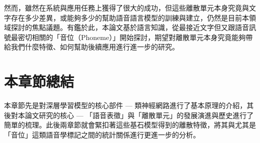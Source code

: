 然而，雖然在系統與應用任務上獲得了很大的成功，但這些離散單元本身究竟與文字存在多少差異，或能夠多少的幫助語音語言模型的訓練與建立，仍然是目前本領域探討的焦點議題。有鑑於此，本論文基於語言知識，從最接近文字但又跟語音訊號最密切相關的「音位（Phoneme）」開始探討，期望對離散單元本身究竟能夠帶給我們什麼特徵、如何幫助後續應用進行進一步的研究。

\section{本章節總結}

本章節先是對深層學習模型的核心部件 --- 類神經網路進行了基本原理的介紹，其後對本論文研究的核心 --- 「語音表徵」與「離散單元」的發展演進與歷史進行了簡單的梳理。此後兩章節就會緊扣著這些基石模型得到的離散特徵，將其與尤其是「音位」這類語音學標記之間的統計關係進行更進一步的分析。
